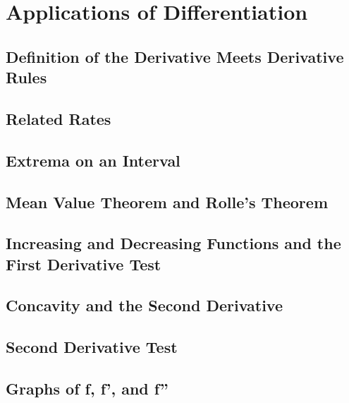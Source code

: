 \documentclass[../bccalc.tex]{subfiles}
\begin{document}
\chapter{Applications of Differentiation}
\section{Definition of the Derivative Meets Derivative Rules}

\section{Related Rates}

\section{Extrema on an Interval}

\section{Mean Value Theorem and Rolle's Theorem}

\section{Increasing and Decreasing Functions and the First Derivative Test}

\section{Concavity and the Second Derivative}

\section{Second Derivative Test}

\section{Graphs of f, f', and f''}
\end{document}
